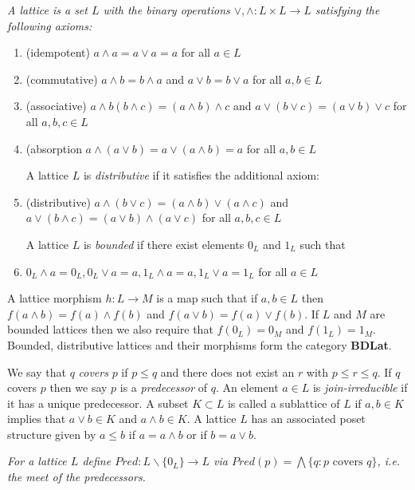 \begin{defn}
{\em
A {\em lattice} is a set $L$ with the binary operations $\vee,\wedge:L\times L\to L$ satisfying the following axioms:

\begin{enumerate}
\item (idempotent) $a\wedge a = a \vee a = a$ for all $a\in L$
\item (commutative) $a\wedge b = b\wedge a$ and $a\vee b = b \vee a$ for all $a,b\in L$
\item (associative) $a\wedge b(b\wedge c) = (a\wedge b)\wedge c$ and $a\vee(b\vee c) = (a\vee b)\vee c$ for all $a,b,c\in L$
\item (absorption $a\wedge (a\vee b) = a\vee (a\wedge b)=a$ for all $a,b\in L$

A lattice $L$ is {\em distributive} if it satisfies the additional axiom:

\item (distributive) $a\wedge (b\vee c) = (a\wedge b)\vee (a\wedge c)$ and $a\vee (b\wedge c) = (a\vee b) \wedge (a\vee c)$ for all $a,b,c\in L$

A lattice $L$ is {\em bounded} if there exist elements $0_L$ and $1_L$ such that

\item $0_L\wedge a = 0_L, 0_L\vee a = a, 1_L\wedge a = a, 1_L\vee a = 1_L$ for all $a\in L$
\end{enumerate}
}
\end{defn}

A lattice morphism $h:L\to M$ is a map such that if $a,b\in L$ then $f(a\wedge b) = f(a)\wedge f(b)$ and $f(a\vee b) = f(a)\vee f(b)$.  If $L$ and $M$ are bounded lattices then we also require that $f(0_L)=0_M$ and $f(1_L)=1_M$.    Bounded, distributive lattices and their morphisms form the category {\bf BDLat}.

We say that $q$ {\em covers} $p$ if $p\leq q$ and there does not exist an $r$ with $p\leq r \leq q$.  If $q$ covers $p$ then we say $p$ is a {\em predecessor} of $q$.  An element $a\in L$ is {\em join-irreducible} if it has a unique predecessor.   A subset $K\subset L$ is called a sublattice of $L$ if $a,b\in K$ implies that $a\vee b\in K$ and $a\wedge b\in K$.  A lattice $L$ has an associated poset structure given by $a\leq b$ if $a=a\wedge b$ or if $b=a\vee b$.

\begin{defn}
{\em
For a lattice $L$ define $Pred:L\backslash \{0_L\} \to L$ via $Pred(p) = \bigwedge \{q: \text{$p$ covers $q$}\}$, i.e. the meet of the predecessors.
}
\end{defn}

